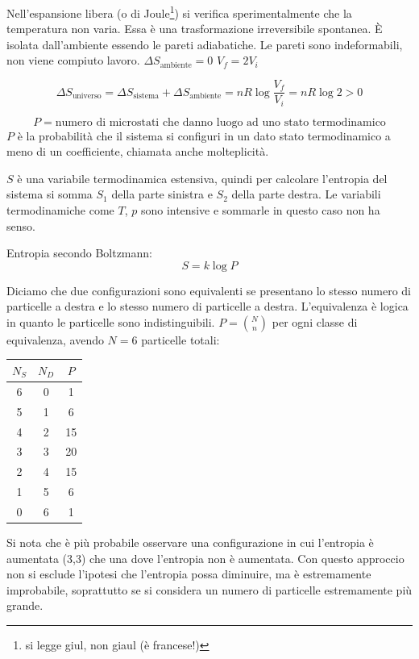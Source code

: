 Nell'espansione libera (o di Joule\footnote{si legge giul, non giaul (è francese!)}) si verifica sperimentalmente che la temperatura non varia. Essa è una trasformazione irreversibile spontanea. \`E isolata dall'ambiente essendo le pareti adiabatiche. Le pareti sono indeformabili, non viene compiuto lavoro. $\Delta S_\text{ambiente}=0$ $V_f=2V_i$

\[\Delta S_\text{universo}=\Delta S_\text{sistema}+\Delta S_\text{ambiente}=nR\log\frac{V_f}{V_i}=nR\log 2>0\]

\[P=\text{numero di microstati che danno luogo ad uno stato termodinamico}\]
$P$ è la probabilità che il sistema si configuri in un dato stato termodinamico a meno di un coefficiente, chiamata anche molteplicità.

$S$ è una variabile termodinamica estensiva, quindi per calcolare l'entropia del sistema si somma $S_1$ della parte sinistra e $S_2$ della parte destra. Le variabili termodinamiche come $T$, $p$ sono intensive e sommarle in questo caso non ha senso.
\begin{legge}
   Entropia secondo Boltzmann:
   \begin{equation}
      S=k\log P
   \end{equation}
\end{legge}
Diciamo che due configurazioni sono equivalenti se presentano lo stesso numero di particelle a destra e lo stesso numero di particelle a destra. L'equivalenza è logica in quanto le particelle sono indistinguibili. $P=\binom{N}{n}$ per ogni classe di equivalenza, avendo $N=6$ particelle totali:
\begin{center}
   \begin{tabular}{c|c|c}
      $N_S$ & $N_D$ & $P$ \\
      \hline
      6     & 0     & 1   \\
      5     & 1     & 6   \\
      4     & 2     & 15  \\
      3     & 3     & 20  \\
      2     & 4     & 15  \\
      1     & 5     & 6   \\
      0     & 6     & 1   \\
   \end{tabular}
\end{center}
Si nota che è più probabile osservare una configurazione in cui l'entropia è aumentata (3,3) che una dove l'entropia non è aumentata. Con questo approccio non si esclude l'ipotesi che l'entropia possa diminuire, ma è estremamente improbabile, soprattutto se si considera un numero di particelle estremamente più grande.

